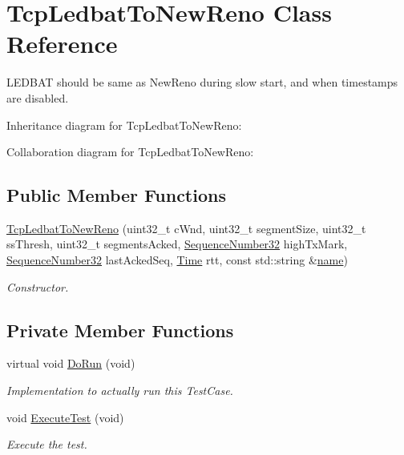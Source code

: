\hypertarget{classTcpLedbatToNewReno}{}\section{Tcp\+Ledbat\+To\+New\+Reno Class Reference}
\label{classTcpLedbatToNewReno}


L\+E\+D\+B\+AT should be same as New\+Reno during slow start, and when timestamps are disabled.  




Inheritance diagram for Tcp\+Ledbat\+To\+New\+Reno\+:


Collaboration diagram for Tcp\+Ledbat\+To\+New\+Reno\+:
\subsection*{Public Member Functions}
\begin{DoxyCompactItemize}
\item 
\hyperlink{classTcpLedbatToNewReno_a885d1728a16344f8c10141be6d709ac7}{Tcp\+Ledbat\+To\+New\+Reno} (uint32\+\_\+t c\+Wnd, uint32\+\_\+t segment\+Size, uint32\+\_\+t ss\+Thresh, uint32\+\_\+t segments\+Acked, \hyperlink{group__network_gacb2070e4e98d2d5135c9bede58f07a03}{Sequence\+Number32} high\+Tx\+Mark, \hyperlink{group__network_gacb2070e4e98d2d5135c9bede58f07a03}{Sequence\+Number32} last\+Acked\+Seq, \hyperlink{classns3_1_1Time}{Time} rtt, const std\+::string \&\hyperlink{generate__test__data__lte__spectrum__model_8m_ab74e6bf80237ddc4109968cedc58c151}{name})
\begin{DoxyCompactList}\small\item\em Constructor. \end{DoxyCompactList}\end{DoxyCompactItemize}
\subsection*{Private Member Functions}
\begin{DoxyCompactItemize}
\item 
virtual void \hyperlink{classTcpLedbatToNewReno_aaae57fa2864111f47631e21dbb19b8a6}{Do\+Run} (void)
\begin{DoxyCompactList}\small\item\em Implementation to actually run this Test\+Case. \end{DoxyCompactList}\item 
void \hyperlink{classTcpLedbatToNewReno_a6d878d7cb843824f66d4cbcc41d9cf2f}{Execute\+Test} (void)
\begin{DoxyCompactList}\small\item\em Execute the test. \end{DoxyCompactList}\end{DoxyCompactItemize}
